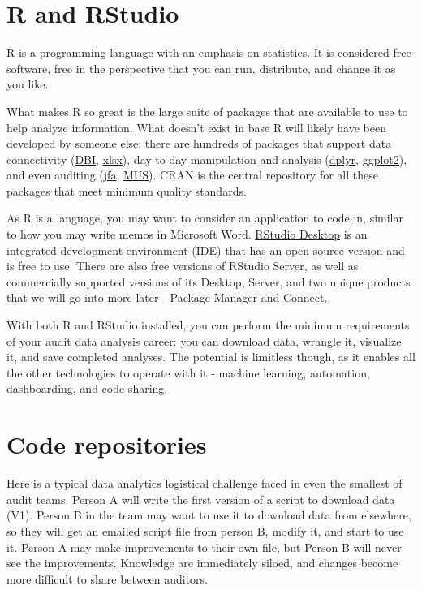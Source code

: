 \documentclass[
]{book}
\begin{document}
\hypertarget{r-and-rstudio}{%
\section{R and RStudio}\label{r-and-rstudio}}

\href{https://www.r-project.org}{R} is a programming language with an emphasis on statistics. It is considered free software, free in the perspective that you can run, distribute, and change it as you like.

What makes R so great is the large suite of packages that are available to use to help analyze information. What doesn't exist in base R will likely have been developed by someone else: there are hundreds of packages that support data connectivity (\href{https://cran.r-project.org/web/packages/DBI/}{DBI}, \href{https://cran.r-project.org/web/packages/xlsx/}{xlsx}), day-to-day manipulation and analysis (\href{https://cran.r-project.org/web/packages/dplyr/}{dplyr}, \href{https://cran.r-project.org/web/packages/ggplot2/}{ggplot2}), and even auditing (\href{https://cran.r-project.org/web/packages/jfa/}{jfa}, \href{https://cran.r-project.org/web/packages/MUS/}{MUS}). CRAN is the central repository for all these packages that meet minimum quality standards.

As R is a language, you may want to consider an application to code in, similar to how you may write memos in Microsoft Word. \href{https://rstudio.com}{RStudio Desktop} is an integrated development environment (IDE) that has an open source version and is free to use. There are also free versions of RStudio Server, as well as commercially supported versions of its Desktop, Server, and two unique products that we will go into more later - Package Manager and Connect.

With both R and RStudio installed, you can perform the minimum requirements of your audit data analysis career: you can download data, wrangle it, visualize it, and save completed analyses. The potential is limitless though, as it enables all the other technologies to operate with it - machine learning, automation, dashboarding, and code sharing.

\hypertarget{code-repositories}{%
\section{Code repositories}\label{code-repositories}}

Here is a typical data analytics logistical challenge faced in even the smallest of audit teams. Person A will write the first version of a script to download data (V1). Person B in the team may want to use it to download data from elsewhere, so they will get an emailed script file from person B, modify it, and start to use it. Person A may make improvements to their own file, but Person B will never see the improvements. Knowledge are immediately siloed, and changes become more difficult to share between auditors.
\end{document}
